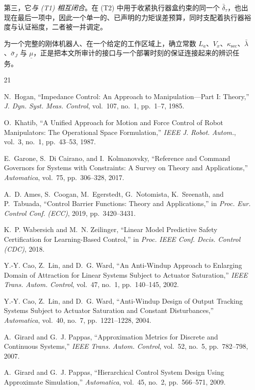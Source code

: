 \documentclass[journal]{IEEEtran}
\begin{document}
第三，它\emph{与 (T1) 相互闭合}。在 (T2) 中用于收紧执行器盒约束的同一个 $\bar\delta_\tau$，也出现在最后一项中，因此一个单一的、已声明的力矩误差预算，同时支配着执行器裕度与认证裕度，二者被一并调定。

为一个完整的刚体机器人、在一个给定的工作区域上，确立常数 $L_a$、$V_x$、$\kappa_{\mathrm{sec}}$、$\bar\lambda$、$\bar\sigma_J$ 与 $\underline\mu$，正是把本文所审计的接口与一个部署时刻的保证连接起来的辨识任务。

\begin{thebibliography}{21}

 N.~Hogan, ``Impedance Control: An Approach to Manipulation---Part I: Theory,'' \emph{J. Dyn. Syst. Meas. Control}, vol.~107, no.~1, pp.~1--7, 1985.

 O.~Khatib, ``A Unified Approach for Motion and Force Control of Robot Manipulators: The Operational Space Formulation,'' \emph{IEEE J. Robot. Autom.}, vol.~3, no.~1, pp.~43--53, 1987.

 E.~Garone, S.~Di Cairano, and I.~Kolmanovsky, ``Reference and Command Governors for Systems with Constraints: A Survey on Theory and Applications,'' \emph{Automatica}, vol.~75, pp.~306--328, 2017.

 A.~D. Ames, S.~Coogan, M.~Egerstedt, G.~Notomista, K.~Sreenath, and P.~Tabuada, ``Control Barrier Functions: Theory and Applications,'' in \emph{Proc. Eur. Control Conf. (ECC)}, 2019, pp.~3420--3431.

 K.~P. Wabersich and M.~N. Zeilinger, ``Linear Model Predictive Safety Certification for Learning-Based Control,'' in \emph{Proc. IEEE Conf. Decis. Control (CDC)}, 2018.

 Y.-Y. Cao, Z.~Lin, and D.~G. Ward, ``An Anti-Windup Approach to Enlarging Domain of Attraction for Linear Systems Subject to Actuator Saturation,'' \emph{IEEE Trans. Autom. Control}, vol.~47, no.~1, pp.~140--145, 2002.

 Y.-Y. Cao, Z.~Lin, and D.~G. Ward, ``Anti-Windup Design of Output Tracking Systems Subject to Actuator Saturation and Constant Disturbances,'' \emph{Automatica}, vol.~40, no.~7, pp.~1221--1228, 2004.

 A.~Girard and G.~J. Pappas, ``Approximation Metrics for Discrete and Continuous Systems,'' \emph{IEEE Trans. Autom. Control}, vol.~52, no.~5, pp.~782--798, 2007.

 A.~Girard and G.~J. Pappas, ``Hierarchical Control System Design Using Approximate Simulation,'' \emph{Automatica}, vol.~45, no.~2, pp.~566--571, 2009.


\end{thebibliography}
\end{document}
